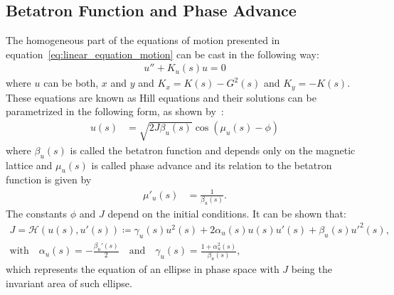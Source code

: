 \subsection{Betatron Function and Phase Advance} \label{ssub:betatron_function}

    The homogeneous part of the equations of motion presented in equation~\eqref{eq:linear_equation_motion} can be cast in the following way:
    \begin{align}
        u'' + K_u(s)u = 0
    \end{align}
    where $u$ can be both, $x$ and $y$ and $K_x=K(s)-G^2(s)$ and $K_y=-K(s)$. These equations are known as Hill equations and their solutions can be parametrized in the following form, as shown by~:
	\begin{align} \label{eq:betatron_motion}
		u(s) &= \sqrt{2J\beta_u(s)} \cos(\mu_u(s) - \phi)
	\end{align}
	where $\beta_u(s)$ is called the betatron function and depends only on the magnetic lattice and $\mu_u(s)$ is called phase advance and its relation to the betatron function is given by
	\begin{align}\label{eq:phase_advance}
		\mu'_u(s) &= \frac{1}{\beta_u(s)}.
	\end{align}
	The constants $\phi$ and $J$ depend on the initial conditions. It can be shown that:
	\begin{gather} \label{eq:linear_invariant}
		J = \mathscr{H}(u(s), u'(s)) \coloneqq \gamma_u(s)u^2(s) + 2\alpha_u(s)u(s)u'(s) + \beta_u(s)u'^2(s), \\[3mm]
        \text{with}\quad
        \alpha_u(s) = -\frac{\beta_u'(s)}{2} \quad \text{and} \nonumber \quad
		\gamma_u(s) = \frac{1+\alpha_u^2(s)}{\beta_u(s)},
	\end{gather}
	which represents the equation of an ellipse in phase space with $J$ being the invariant area of such ellipse.

